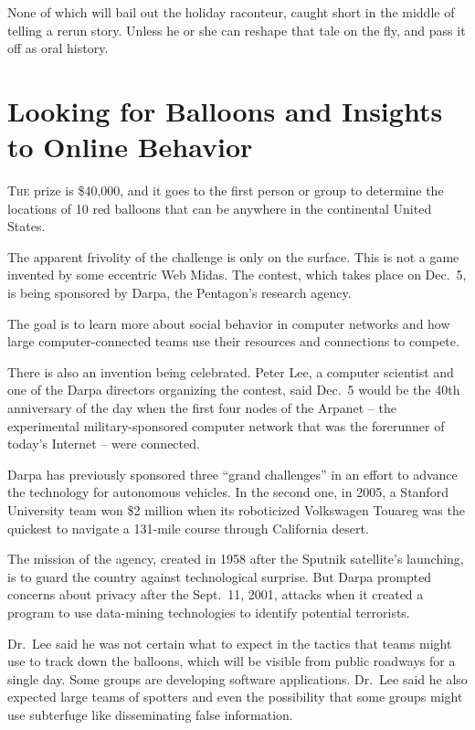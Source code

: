 ﻿\documentclass[12pt]{article}
\begin{document}
None of which will bail out the holiday raconteur, caught short in the middle of telling a rerun
story. Unless he or she can reshape that tale on the fly, and pass it off as oral history.

\section{Looking for Balloons and Insights to Online Behavior}

\lettrine{T}{he} prize is \$40,000, and it goes to the first person or group
to determine the locations of 10 red balloons that can be anywhere in the continental United States.

The apparent frivolity of the challenge is only on the surface. This is not a game invented by some
eccentric Web Midas. The contest, which takes place on Dec.~5, is being sponsored by Darpa, the
Pentagon's research agency.

The goal is to learn more about social behavior in computer networks and how large
computer-connected teams use their resources and connections to compete.

There is also an invention being celebrated. Peter Lee, a computer scientist and one of the Darpa
directors organizing the contest, said Dec.~5 would be the 40th anniversary of the day when the
first four nodes of the Arpanet -- the experimental military-sponsored computer network that was the
forerunner of today's Internet -- were connected.

Darpa has previously sponsored three ``grand challenges'' in an effort to advance the technology for
autonomous vehicles. In the second one, in 2005, a Stanford University team won \$2 million when its
roboticized Volkswagen Touareg was the quickest to navigate a 131-mile course through California
desert.

The mission of the agency, created in 1958 after the Sputnik satellite's launching, is to guard the
country against technological surprise. But Darpa prompted concerns about privacy after the
Sept.~11, 2001, attacks when it created a program to use data-mining technologies to identify
potential terrorists.

Dr.~Lee said he was not certain what to expect in the tactics that teams might use to track down the
balloons, which will be visible from public roadways for a single day. Some groups are developing
software applications. Dr.~Lee said he also expected large teams of spotters and even the
possibility that some groups might use subterfuge like disseminating false information.
\end{document}
